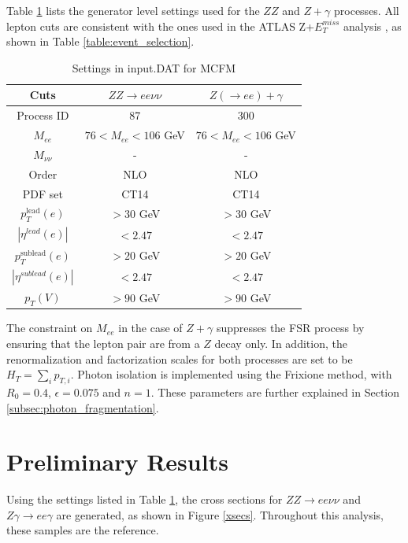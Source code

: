 \documentclass[11pt,a4paper,openright,twoside]{report}
\begin{document}
\renewcommand{\thefootnote}{\fnsymbol{footnote}} 
Table \ref{table:default} lists the generator level settings used for the $ZZ$ and $Z+\gamma$ processes. All lepton cuts are consistent with the ones used in the ATLAS Z+$E_T^{miss}$ analysis \cite{ZH_ATLAS}, as shown in Table \ref{table:event_selection}.
\begin{table}[H]
\begin{center}
	\begin{tabular}{|c|c|c|}
	\hline
	\textbf{Cuts} &$ZZ \rightarrow ee\nu\nu$ & $Z(\rightarrow ee)+\gamma$\\
	\hline
	Process ID & 87 & 300\\
	$M_{ee}$ & $76 < M_{ee} < 106$ GeV & $76 < M_{ee} < 106$ GeV\\
	$M_{\nu\nu}$ & - & -\\
	Order & NLO & NLO\\
	PDF set & CT14 & CT14\\
	$p_T^{\text{lead}}(e)$ & $> 30$ GeV & $> 30$ GeV\\
	$|\eta^{lead}(e)|$ & $< 2.47$ & $< 2.47$\\
	$p_T^{\text{sublead}}(e)$ & $> 20$ GeV & $> 20$ GeV\\
	$|\eta^{sublead}(e)|$ & $< 2.47$ & $< 2.47$\\
	$p_T(V)$\footnotemark & $> 90$ GeV & $> 90$ GeV\\
	\hline
	\end{tabular}
	\caption{Settings in input.DAT for MCFM}
	\label{table:default}
\end{center}
\end{table}

The constraint on $M_{ee}$ in the case of $Z+\gamma$ suppresses the FSR process by ensuring that the lepton pair are from a $Z$ decay only. In addition, the renormalization and factorization scales for both processes are set to be $H_T = \sum_i p_{T,i}$. Photon isolation is implemented using the Frixione \cite{frixione} method, with $R_0=0.4$, $\epsilon=0.075$ and $n=1$. These parameters are further explained in Section \ref{subsec:photon_fragmentation}.

\renewcommand{\thefootnote}{\arabic{footnote}}

\section{Preliminary Results}
Using the settings listed in Table \ref{table:default}, the cross sections for $ZZ\to ee\nu\nu$ and $Z\gamma\to ee\gamma$ are generated, as shown in Figure \ref{xsecs}. Throughout this analysis, these samples are the reference.
\end{document}
